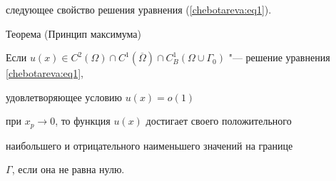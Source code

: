 следующее свойство решения уравнения (\ref{chebotareva:eq1}).





\begin{newthm}{Теорема (Принцип максимума)}


Если $u(x) {\in} C^2\!\left( \Omega \right) \cap C^1\!\left( {\overline


\Omega } \right) \cap C_B^1 \!\left( {\Omega \cup \Gamma _0 }


\right)$ "--- решение уравнения \eqref{chebotareva:eq1}, 


удовлетворяющее условию $u\left( x \right) = o\left( 1 \right)$


при $x_p \to 0$,  то функция $u(x)$ достигает своего положительного


наибольшего и отрицательного наименьшего значений на границе


$\Gamma $,  если она не равна нулю.


\end{newthm}


